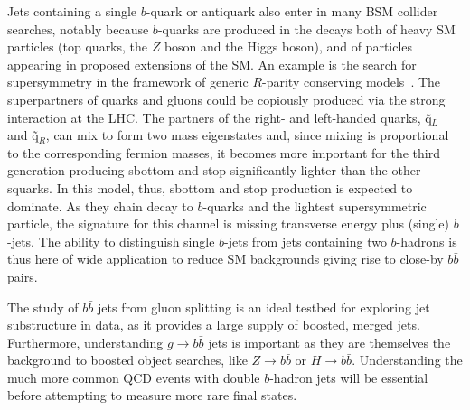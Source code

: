 Jets containing a single $b$-quark or antiquark %
also enter in many BSM collider searches, notably because $b$-quarks are produced in the decays both of heavy SM particles (top quarks, the $Z$ boson and the Higgs boson), and of particles appearing in proposed extensions of the SM.  %
 An example is the search for supersymmetry in the framework of generic $R$-parity conserving models~\cite{ATLAS-CONF-2011-098}. The superpartners of quarks and gluons could be copiously produced via the strong interaction at the LHC. The partners of the right- and left-handed quarks, \~{q}$_{L}$ and  \~{q}$_{R}$, can mix to form two mass eigenstates and, since mixing is proportional to the corresponding fermion masses, it becomes more important for the third generation producing sbottom and stop significantly lighter than the other squarks. In this model, thus, sbottom and stop production is expected to dominate. As they chain decay to $b$-quarks and the lightest supersymmetric particle, the signature for this channel is missing transverse energy %
plus (single) $b$-jets. The ability to distinguish single $b$-jets from jets containing two $b$-hadrons is thus here of wide application to reduce SM backgrounds giving rise to close-by $b\bar{b}$ pairs. %



   The study of $b\bar{b}$ jets from gluon splitting is an ideal testbed for exploring jet substructure in data, as it provides a large supply of boosted, merged jets. Furthermore, understanding $g\rightarrow b \bar{b}$ jets is important as they are themselves the background to boosted object searches, like $Z\rightarrow b\bar{b}$ or $H\rightarrow b \bar{b}$.  %
Understanding the much more common QCD events with double $b$-hadron jets will be essential before attempting to measure more rare final states.



